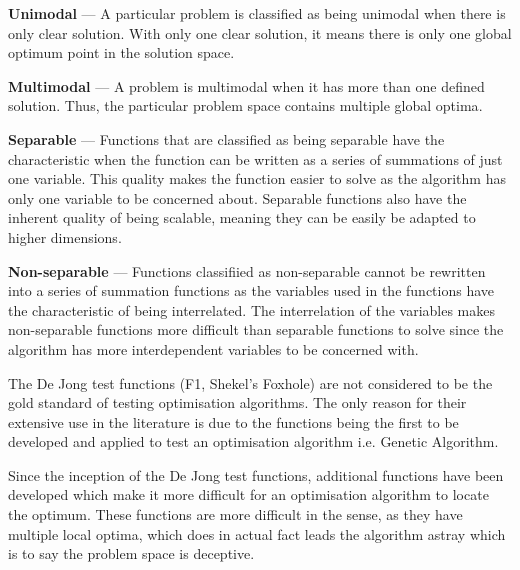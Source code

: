 \begin{description}
\item{\textbf{Unimodal}} --- A particular problem is classified as being unimodal when there is only clear solution. With only one clear solution, it means there is only one global optimum point in the solution space\cite{evalevoalgo,numericalABC,FundamentalSwarm,CompuIntelligenceIntro}.
\item{\textbf{Multimodal}} --- A problem is multimodal when it has more than one defined solution. Thus, the particular problem space contains multiple global optima\cite{evalevoalgo,numericalABC,FundamentalSwarm,CompuIntelligenceIntro}.
\item{\textbf{Separable}} --- Functions that are classified as being separable have the characteristic when the function can be written as a series of summations of just one variable\cite{numericalABC}. This quality makes the function easier to solve as the algorithm has only one variable to be concerned about\cite{evalevoalgo,numericalABC}. Separable functions also have the inherent quality of being scalable, meaning they can be easily be adapted to higher dimensions\cite{evalevoalgo,numericalABC}.
\item{\textbf{Non-separable}} --- Functions classifiied as non-separable cannot be rewritten into a series of summation functions as the variables used in the functions have the characteristic of being interrelated\cite{evalevoalgo,numericalABC}. The interrelation of the variables makes non-separable functions more difficult than separable functions to solve since the algorithm has more interdependent variables to be concerned with\cite{evalevoalgo,numericalABC}.
\end{description}

The De Jong test functions (F1, Shekel's Foxhole) are not considered to be the gold standard of testing optimisation algorithms\cite{evalevoalgo}. The only reason for their extensive use in the literature is due to the functions being the first to be developed and applied to test an optimisation algorithm i.e. Genetic Algorithm\cite{devparallelgasa,evalevoalgo}.

Since the inception of the De Jong test functions, additional functions have been developed which make it more difficult for an optimisation algorithm to locate the optimum\cite{evalevoalgo}. These functions are more difficult in the sense, as they have multiple local optima, which does in actual fact leads the algorithm astray which is to say the problem space is deceptive\cite{CompuIntelligenceIntro,FundamentalSwarm,evalevoalgo}. 

